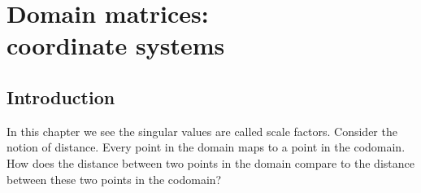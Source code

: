 \chapter[Domain matrices: coordinate systems]{Domain matrices:\\ coordinate systems}

\section{Introduction}
In this chapter we see the singular values are called scale factors. Consider the notion of distance. Every point in the domain maps to a point in the codomain. How does the distance between two points in the domain compare to the distance between these two points in the codomain?





%

\endinput